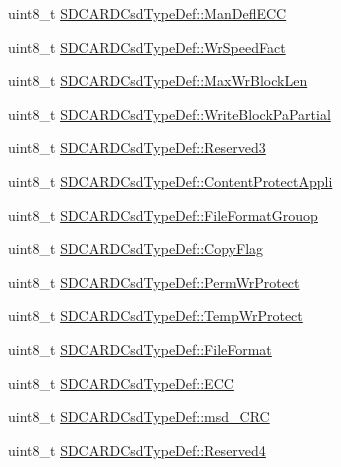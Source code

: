 \begin{DoxyCompactItemize}
uint8\-\_\-t \hyperlink{group___p_i_o_s___s_d_c_a_r_d_ga638d0d0306f38092eba2d405639c2099}{\-S\-D\-C\-A\-R\-D\-Csd\-Type\-Def\-::\-Man\-Defl\-E\-C\-C}
\item 
uint8\-\_\-t \hyperlink{group___p_i_o_s___s_d_c_a_r_d_gad518a80289b8949800c8f7e50fc4b21f}{\-S\-D\-C\-A\-R\-D\-Csd\-Type\-Def\-::\-Wr\-Speed\-Fact}
\item 
uint8\-\_\-t \hyperlink{group___p_i_o_s___s_d_c_a_r_d_gac00127b98cb9a3a0e1a0bc7960570992}{\-S\-D\-C\-A\-R\-D\-Csd\-Type\-Def\-::\-Max\-Wr\-Block\-Len}
\item 
uint8\-\_\-t \hyperlink{group___p_i_o_s___s_d_c_a_r_d_gaa2d30b075bc701aef9e50397db088180}{\-S\-D\-C\-A\-R\-D\-Csd\-Type\-Def\-::\-Write\-Block\-Pa\-Partial}
\item 
uint8\-\_\-t \hyperlink{group___p_i_o_s___s_d_c_a_r_d_ga2912ee762425a05b026c2c66039b859b}{\-S\-D\-C\-A\-R\-D\-Csd\-Type\-Def\-::\-Reserved3}
\item 
uint8\-\_\-t \hyperlink{group___p_i_o_s___s_d_c_a_r_d_ga0ff4eb4714ed988bfe5d6418f553dee3}{\-S\-D\-C\-A\-R\-D\-Csd\-Type\-Def\-::\-Content\-Protect\-Appli}
\item 
uint8\-\_\-t \hyperlink{group___p_i_o_s___s_d_c_a_r_d_ga19785f76dae23ac16c7af85cc6c88460}{\-S\-D\-C\-A\-R\-D\-Csd\-Type\-Def\-::\-File\-Format\-Grouop}
\item 
uint8\-\_\-t \hyperlink{group___p_i_o_s___s_d_c_a_r_d_ga24efbbd2c557f214a8bfcec06ce30d19}{\-S\-D\-C\-A\-R\-D\-Csd\-Type\-Def\-::\-Copy\-Flag}
\item 
uint8\-\_\-t \hyperlink{group___p_i_o_s___s_d_c_a_r_d_ga191082389493442ce0b103f97282b952}{\-S\-D\-C\-A\-R\-D\-Csd\-Type\-Def\-::\-Perm\-Wr\-Protect}
\item 
uint8\-\_\-t \hyperlink{group___p_i_o_s___s_d_c_a_r_d_ga3a9535629b4573d3dbe39dabd51b341a}{\-S\-D\-C\-A\-R\-D\-Csd\-Type\-Def\-::\-Temp\-Wr\-Protect}
\item 
uint8\-\_\-t \hyperlink{group___p_i_o_s___s_d_c_a_r_d_gaf227b9cb873b11bbee9ce41d8bcaa3d1}{\-S\-D\-C\-A\-R\-D\-Csd\-Type\-Def\-::\-File\-Format}
\item 
uint8\-\_\-t \hyperlink{group___p_i_o_s___s_d_c_a_r_d_ga5e147c22c2995b291b7a5ea1a600c5a0}{\-S\-D\-C\-A\-R\-D\-Csd\-Type\-Def\-::\-E\-C\-C}
\item 
uint8\-\_\-t \hyperlink{group___p_i_o_s___s_d_c_a_r_d_ga653812c0595db0ef3eddae3dbf409b87}{\-S\-D\-C\-A\-R\-D\-Csd\-Type\-Def\-::msd\-\_\-\-C\-R\-C}
\item 
uint8\-\_\-t \hyperlink{group___p_i_o_s___s_d_c_a_r_d_ga2154190e5c6f32ce3b67bdc4a9aa3982}{\-S\-D\-C\-A\-R\-D\-Csd\-Type\-Def\-::\-Reserved4}

\end{DoxyCompactItemize}
